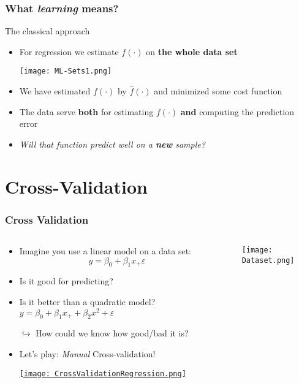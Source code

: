 \documentclass[xcolor=x11names,compress, aspectratio=169]{beamer}
\renewcommand{\(}{\begin{columns}}
\renewcommand{\)}{\end{columns}}
\newcommand{\<}[1]{\begin{column}{#1}}
\renewcommand{\>}{\end{column}}
\begin{document}
\begin{frame}
\frametitle{\textcolor{brique}{ What \emph{learning} means?}}
The classical approach
\begin{itemize}[<+->]
\item For regression we estimate $f(\cdot)$ on \textbf{the whole data set}
\item[] \texttt{[image: ML-Sets1.png]}
\item We have estimated $f(\cdot)$ by $\widehat f(\cdot)$  and minimized some cost function
\item The data serve \textbf{both} for estimating $f(\cdot)$ \textbf{and} computing the prediction error
\item \emph{Will that function predict well on a \textcolor[rgb]{1.00,0.00,0.00}{\textbf{new }}sample?}
\end{itemize}
\end{frame}

\section{Cross-Validation}

\begin{frame} %
\frametitle{Cross Validation}
\begin{columns}[t]
 \begin{column}{0.7\textwidth}
 \begin{itemize}[<+->]
    \item Imagine you use a linear model on a data set:  $$y = \beta_0 + \beta_1 x_ + \varepsilon$$
    \item  Is it good for predicting?
    \item Is it better than a quadratic model? $y = \beta_0 + \beta_1 x_ + + \beta_2 x^2+ \varepsilon$
    \item[$\hookrightarrow$] How could we know how good/bad it is?
    \item Let's play:  \emph{Manual} Cross-validation!
    \item[]  \href{https://xtophedataviz.shinyapps.io/MLRegressionExample/}{\texttt{[image: CrossValidationRegression.png]}}
 \end{itemize}
 \end{column}
    \begin{column}{0.5\textwidth}
       \begin{itemize}
        \item[] \texttt{[image: Dataset.png]}
       \end{itemize}
    \end{column}
\end{columns}
\end{frame}
\end{document}
